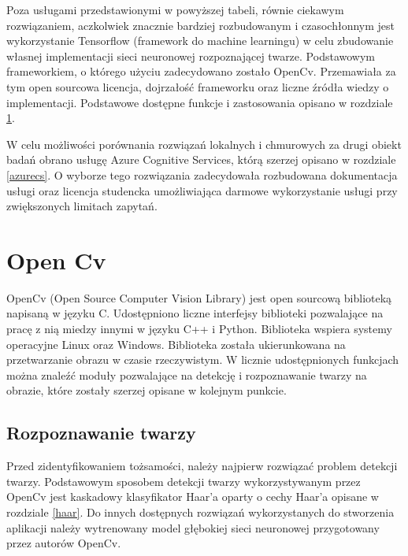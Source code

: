 Poza usługami przedstawionymi w powyższej tabeli, równie ciekawym rozwiązaniem, aczkolwiek znacznie bardziej rozbudowanym i czasochłonnym jest wykorzystanie Tensorflow (framework do machine learningu) w celu zbudowanie własnej implementacji sieci neuronowej rozpoznającej twarze.
Podstawowym frameworkiem, o którego użyciu zadecydowano zostało OpenCv. Przemawiała za tym open sourcowa licencja, dojrzałość frameworku oraz liczne źródła wiedzy o implementacji. Podstawowe dostępne funkcje i zastosowania opisano w rozdziale \ref{s:open_cv}.

W celu możliwości porównania rozwiązań lokalnych i chmurowych za drugi obiekt badań obrano usługę Azure Cognitive Services, którą szerzej opisano w rozdziale \ref{azurecs}. O wyborze tego rozwiązania zadecydowała rozbudowana dokumentacja usługi oraz licencja studencka umożliwiająca darmowe wykorzystanie usługi przy zwiększonych limitach zapytań.

\section{Open Cv} \label{s:open_cv}
OpenCv (Open Source Computer Vision Library) jest open sourcową biblioteką napisaną w języku C. Udostępniono liczne interfejsy biblioteki pozwalające na pracę z nią miedzy innymi w języku C++ i Python. Biblioteka wspiera systemy operacyjne Linux oraz Windows. Biblioteka została ukierunkowana na przetwarzanie obrazu w czasie rzeczywistym. W licznie udostępnionych funkcjach można znaleźć moduły pozwalające na detekcję i rozpoznawanie twarzy na obrazie, które zostały szerzej opisane w kolejnym punkcie.

\subsection{Rozpoznawanie twarzy }
Przed zidentyfikowaniem tożsamości, należy najpierw rozwiązać problem detekcji twarzy. Podstawowym sposobem detekcji twarzy wykorzystywanym przez OpenCv jest kaskadowy klasyfikator Haar'a oparty o cechy Haar'a opisane w rozdziale \ref{haar}. Do innych dostępnych rozwiązań wykorzystanych do stworzenia aplikacji należy wytrenowany model głębokiej sieci neuronowej przygotowany przez autorów OpenCv.
